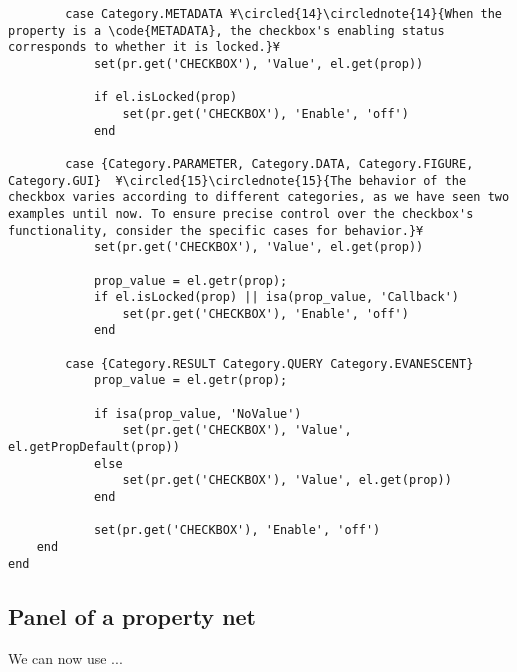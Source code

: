 \documentclass{tufte-handout}
\begin{document}
\begin{lstlisting}
        case Category.METADATA ¥\circled{14}\circlednote{14}{When the property is a \code{METADATA}, the checkbox's enabling status corresponds to whether it is locked.}¥
            set(pr.get('CHECKBOX'), 'Value', el.get(prop))

            if el.isLocked(prop)
                set(pr.get('CHECKBOX'), 'Enable', 'off')
            end
            
        case {Category.PARAMETER, Category.DATA, Category.FIGURE, Category.GUI}  ¥\circled{15}\circlednote{15}{The behavior of the checkbox varies according to different categories, as we have seen two examples until now. To ensure precise control over the checkbox's functionality, consider the specific cases for behavior.}¥
            set(pr.get('CHECKBOX'), 'Value', el.get(prop))

            prop_value = el.getr(prop);
            if el.isLocked(prop) || isa(prop_value, 'Callback')
                set(pr.get('CHECKBOX'), 'Enable', 'off')
            end
            
        case {Category.RESULT Category.QUERY Category.EVANESCENT}
            prop_value = el.getr(prop);

            if isa(prop_value, 'NoValue')
                set(pr.get('CHECKBOX'), 'Value', el.getPropDefault(prop))
            else
                set(pr.get('CHECKBOX'), 'Value', el.get(prop))
            end
            
            set(pr.get('CHECKBOX'), 'Enable', 'off')
    end
end

\end{lstlisting}



\clearpage
\subsection{Panel of a property net}

We can now use ...


%
%
\end{document}
